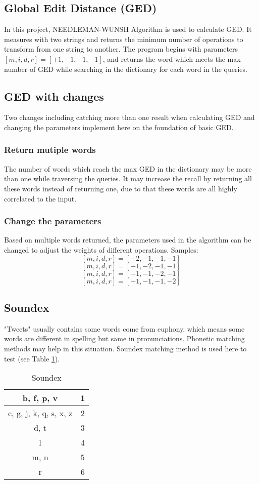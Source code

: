 \documentclass[11pt]{article}
\begin{document}
\subsection{Global Edit Distance (GED)}
In this project, NEEDLEMAN-WUNSH Algorithm is used to calculate GED. It measures with two strings and returns the minimum number of operations to transform from one string to another. The program begins with parameters $[m,i,d,r] = [+1,-1,-1,-1]$, and returns the word which meets the max number of GED while searching in the dictionary for each word in the queries.
\subsection{GED with changes}
Two changes including catching more than one result when calculating GED and changing the parameters implement here on the foundation of basic GED.
\subsubsection{Return mutiple words}
The number of words which reach the max GED in the dictionary may be more than one while traversing the queries. It may increase the recall by returning all these words instead of returning one, due to that these words are all highly correlated to the input.
\subsubsection{Change the parameters}
Based on multiple words returned, the parameters used in the algorithm can be changed to adjust the weights of different operations. 
Samples: 
$$[m,i,d,r] = [+2,-1,-1,-1]$$
$$[m,i,d,r] = [+1,-2,-1,-1]$$
$$[m,i,d,r] = [+1,-1,-2,-1]$$
$$[m,i,d,r] = [+1,-1,-1,-2]$$
\subsection{Soundex}
"Tweets" usually contains some words come from euphony, which means some words are different in spelling but same in pronunciations. Phonetic matching methods may help in this situation. Soundex matching method is used here to test (see Table \ref{table1}).
\begin{table}[h]
    \begin{center}
        \begin{tabular}{|c|c|}
            \hline
            b, f, p, v & 1 \\ \hline
            c, g, j, k, q, s, x, z& 2 \\ \hline
            d, t & 3 \\ \hline
            l & 4 \\ \hline
            m, n & 5 \\ \hline
            r & 6 \\ \hline
        \end{tabular}
        \caption{Soundex}\label{table1}
    \end{center}
\end{table}
\end{document}
